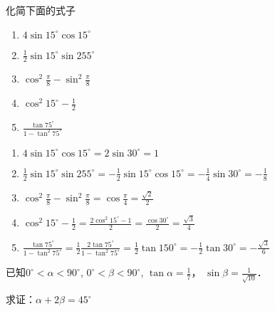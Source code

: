 \begin{example}
    化简下面的式子
\begin{multicols}{2}
\begin{enumerate}
    \item $4\sin 15^{\circ}\cos 15^{\circ}$
    \item $\frac{1}{2}\sin 15^{\circ}\sin 255^{\circ}$
    \item $\cos^2\frac{\pi}{8}-\sin^2\frac{\pi}{8}$
    \item $\cos^2 15^{\circ}-\frac{1}{2}$
    \item $\frac{\tan 75^{\circ}}{1-\tan^2 75^{\circ}}$
\end{enumerate}
   \end{multicols} 
\end{example}

\begin{solution}
\begin{enumerate}
    \item $4\sin 15^{\circ}\cos 15^{\circ}=2\sin 30^{\circ}=1$
    \item $\frac{1}{2}\sin 15^{\circ}\sin 255^{\circ}=-\frac{1}{2}\sin 15^{\circ}\cos 15^{\circ}=-\frac{1}{4}\sin 30^{\circ}=-\frac{1}{8}$
    \item $\cos^2\frac{\pi}{8}-\sin^2\frac{\pi}{8}=\cos\frac{\pi}{4}=\frac{\sqrt{2}}{2}$
    \item $\cos^2 15^{\circ}-\frac{1}{2}=\frac{2\cos^2 15^{\circ}-1}{2}=\frac{\cos 30^{\circ}}{2}=\frac{\sqrt{3}}{4}$
    \item $\frac{\tan 75^{\circ}}{1-\tan^2 75^{\circ}}=\frac{1}{2}\frac{2\tan 75^{\circ}}{1-\tan^2 75^{\circ}}=\frac{1}{2}\tan 150^{\circ}=-\frac{1}{2}\tan 30^{\circ}=-\frac{\sqrt{3}}{6}$
\end{enumerate}    
\end{solution}

\begin{example}
    已知$0^{\circ}<\alpha<90^{\circ}$, $0^{\circ}<\beta<90^{\circ}$, $\tan\alpha=\frac{1}{7}$，
    $\sin\beta=\frac{1}{\sqrt{10}}$．
    
    求证：$\alpha+2\beta=45^{\circ}$
\end{example}

\begin{figure}[htp]
    \centering
    \caption{}
\end{figure}


